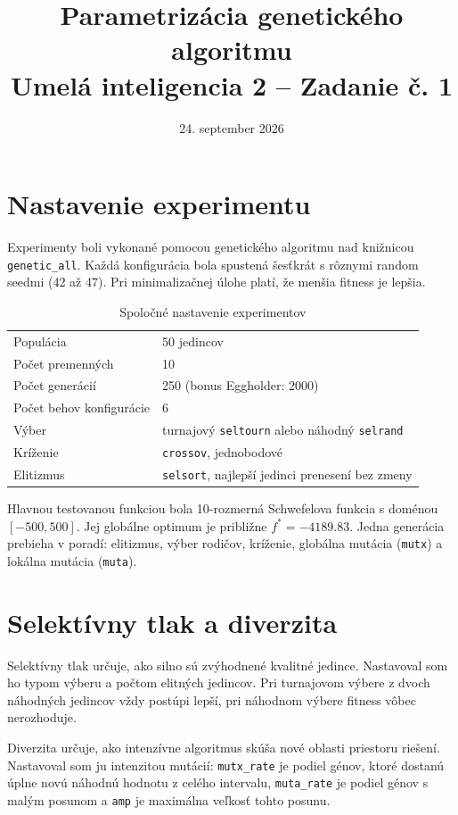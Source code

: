 \documentclass[11pt,a4paper]{article}
\title{Parametrizácia genetického algoritmu\\\large Umelá inteligencia 2 -- Zadanie č. 1}
\author{}
\date{24. september 2026}
\begin{document}
\maketitle

\section{Nastavenie experimentu}

Experimenty boli vykonané pomocou genetického algoritmu nad knižnicou
\texttt{genetic\_all}. Každá konfigurácia bola spustená šesťkrát s rôznymi
random seedmi (42 až 47). Pri minimalizačnej úlohe platí, že menšia
fitness je lepšia.

\begin{table}[H]
\centering
\caption{Spoločné nastavenie experimentov}
\begin{tabular}{ll}
\toprule
Populácia & 50 jedincov \\
Počet premenných & 10 \\
Počet generácií & 250 (bonus Eggholder: 2000) \\
Počet behov konfigurácie & 6 \\
Výber & turnajový \texttt{seltourn} alebo náhodný \texttt{selrand} \\
Kríženie & \texttt{crossov}, jednobodové \\
Elitizmus & \texttt{selsort}, najlepší jedinci prenesení bez zmeny \\
\bottomrule
\end{tabular}
\end{table}

Hlavnou testovanou funkciou bola 10-rozmerná Schwefelova funkcia s doménou
$[-500,500]$. Jej globálne optimum je približne $f^*=-4189.83$. Jedna generácia
prebieha v poradí: elitizmus, výber rodičov, kríženie, globálna mutácia
(\texttt{mutx}) a lokálna mutácia (\texttt{muta}).

\section{Selektívny tlak a diverzita}

Selektívny tlak určuje, ako silno sú zvýhodnené kvalitné jedince. Nastavoval som
ho typom výberu a počtom elitných jedincov. Pri turnajovom výbere z dvoch náhodných
jedincov vždy postúpi lepší, pri náhodnom výbere fitness vôbec nerozhoduje.

Diverzita určuje, ako intenzívne algoritmus skúša nové oblasti priestoru riešení.
Nastavoval som ju intenzitou mutácií: \texttt{mutx\_rate} je podiel génov, ktoré
dostanú úplne novú náhodnú hodnotu z celého intervalu, \texttt{muta\_rate} je
podiel génov s malým posunom a \texttt{amp} je maximálna veľkosť tohto posunu.
\end{document}
